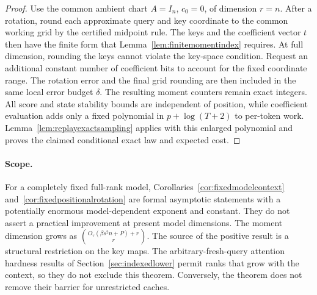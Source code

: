 \begin{proof}
Use the common ambient chart $A=I_n$, $c_0=0$, of dimension
$r=n$.  After a rotation, round each approximate query and key
coordinate to the common working grid by the certified midpoint
rule.  The keys and the coefficient vector $t$ then have the finite
form that Lemma~\ref{lem:finitemomentindex} requires.  At full
dimension, rounding the keys cannot violate the key-space condition.
Request an additional constant number of coefficient bits to
account for the fixed coordinate range.  The rotation error
and the final grid rounding are then included in the same
local error budget $\delta$.  The resulting moment counters
remain exact integers.  All score and state stability bounds
are independent of position, while coefficient evaluation
adds only a fixed polynomial in $p+\log(T+2)$ to per-token
work.  Lemma~\ref{lem:replayexactsampling} applies with this
enlarged polynomial and proves the claimed conditional exact
law and expected cost.
\end{proof}

\paragraph{Scope.}
For a completely fixed full-rank model,
Corollaries~\ref{cor:fixedmodelcontext}
and~\ref{cor:fixedpositionalrotation} are formal asymptotic
statements with a potentially enormous model-dependent exponent and
constant.  They do not assert a practical improvement at present
model dimensions.  The moment dimension grows as
$\binom{O_r(\beta s^2n+P)+r}{r}$.
The source of the positive result is a structural restriction on
the key maps.  The arbitrary-fresh-query attention hardness results
of Section~\ref{sec:indexedlower} permit ranks that grow with the
context, so they do not exclude this theorem.  Conversely, the theorem does not remove their
barrier for unrestricted caches.

